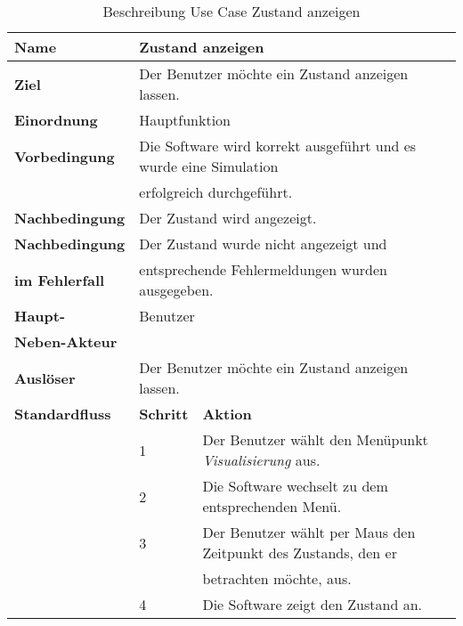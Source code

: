 \begin{table} [H]
	\centering
	\begin{tabular}{|l|l|l|}
		\hline
		\textbf{Name} 			& \multicolumn{2}{|l|}{Zustand anzeigen}  \\
		\hline
		\textbf{Ziel} 			& \multicolumn{2}{|l|}{Der Benutzer möchte ein Zustand anzeigen lassen. }\\ 
		\hline
		\textbf{Einordnung}		& \multicolumn{2}{|l|}{Hauptfunktion}\\
		\hline
		\textbf{Vorbedingung}	& \multicolumn{2}{|l|}{Die Software wird korrekt ausgeführt und es wurde eine Simulation} \\
		& \multicolumn{2}{|l|}{ erfolgreich durchgeführt.} \\
		\hline
		\textbf{Nachbedingung}	& \multicolumn{2}{|l|}{Der Zustand wird angezeigt.}\\
		\hline
		\textbf{Nachbedingung} 	& \multicolumn{2}{|l|}{Der Zustand wurde nicht angezeigt und}\\
		\textbf{im Fehlerfall}	& \multicolumn{2}{|l|}{entsprechende Fehlermeldungen wurden ausgegeben.}\\
		\hline
		\textbf{Haupt-} 		& \multicolumn{2}{|l|}{Benutzer}\\
		\textbf{Neben-Akteur}	& \multicolumn{2}{|l|}{	}			\\
		\hline
		\textbf{Auslöser} 		& \multicolumn{2}{|l|}{Der Benutzer möchte ein Zustand anzeigen lassen.} \\
		\hline 
		\textbf{Standardfluss} & \textbf{Schritt} & \textbf{Aktion} \\
		\hline
		&	1	& Der Benutzer wählt den Menüpunkt \emph{Visualisierung} aus. \\
		\cline{2-3}
		&	2	& Die Software wechselt zu dem entsprechenden Menü.\\
		\cline{2-3}
		&	3	& Der Benutzer wählt per Maus den Zeitpunkt des Zustands, den er\\ 
		&       & betrachten möchte, aus.\\
		\cline{2-3}
		&	4	& Die Software zeigt den Zustand an.\\
		\hline
	\end{tabular}
	\caption{Beschreibung Use Case Zustand anzeigen}
	\label{Beschreibung Use Case Zustand_anzeigen}
\end{table}

